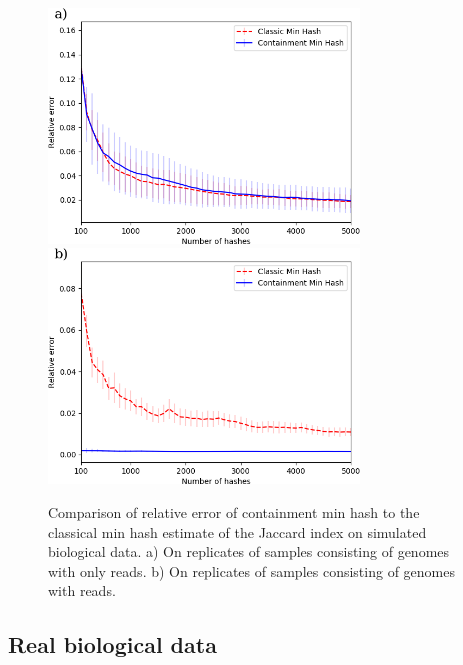 \documentclass[11pt]{amsart}
\theoremstyle{remark}
\numberwithin{equation}{section}
\newcommand{\themethod}{containment min hash }
\newcommand{\SimulatedBiologicalDataNumGenomes}{\protect }
\newcommand{\SimulatedBiologicalDataNumReads}{\protect }
\newcommand{\SimulatedBiologicalDataNumReplicates}{\protect }
\newcommand{\SimulatedBiologicalDataSmallNumGenomes}{\protect }
\newcommand{\SimulatedBiologicalDataSmallNumReads}{\protect }
\newcommand{\SimulatedBiologicalDataSmallNumReplicates}{\protect }
\begin{document}
\begin{figure}[!h]%
\begin{center}
\includegraphics[width=3.25in,trim={0 0 0 0in},clip]{Figs/SimulatedBiologicalData_small.png}%
\includegraphics[width=3.25in,trim={0 0 0 0in},clip]{Figs/SimulatedBiologicalData.png}
\end{center}
\caption{Comparison of relative error of \themethod to the classical min hash estimate of the Jaccard index on simulated biological data. a) On \SimulatedBiologicalDataSmallNumReplicates replicates of samples consisting of \SimulatedBiologicalDataSmallNumGenomes genomes with only \SimulatedBiologicalDataSmallNumReads reads. b) On \SimulatedBiologicalDataNumReplicates replicates of samples consisting of \SimulatedBiologicalDataNumGenomes genomes with \SimulatedBiologicalDataNumReads reads.
}
\label{fig:SimulatedBiologicalData}%
\end{figure}

\subsection{Real biological data}
\end{document}
